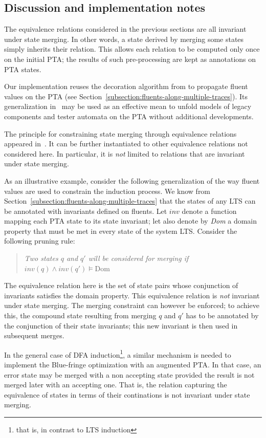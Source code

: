 \subsection{Discussion and implementation notes\label{subsection:qsm-constraints-implementation-notes}}

The equivalence relations considered in the previous sections are all invariant under state merging. In other words, a state derived by merging some states simply inherits their relation. This allows each relation to be computed only once on the initial PTA; the results of such pre-processing are kept as annotations on PTA states. 

Our implementation reuses the decoration algorithm from \cite{Damas:2006} to propagate fluent values on the PTA (see Section~\ref{subsection:fluents-along-multiple-traces}). Its generalization in~\cite{Damas:2011} may be used as an effective mean to unfold models of legacy components and tester automata on the PTA without additional developments.

The principle for constraining state merging through equivalence relations appeared in~\cite{Coste:1998, Coste:2004}. It can be further instantiated to other equivalence relations not considered here. In particular, it is \emph{not} limited to relations that are invariant under state merging.

As an illustrative example, consider the following generalization of the way fluent values are used to constrain the induction process. We know from Section~\ref{subsection:fluents-along-multiple-traces} that the states of any LTS can be annotated with invariants defined on fluents. Let $inv$ denote a function mapping each PTA state to its state invariant; let also denote by \emph{Dom} a domain property that must be met in every state of the system LTS. Consider the following pruning rule:
\begin{quote}
\emph{Two states $q$ and $q'$ will be considered for merging if $inv(q) \wedge inv(q') \models \mbox{Dom}$}
\end{quote}

The equivalence relation here is the set of state pairs whose conjunction of invariants satisfies the domain property. This equivalence relation is \emph{not} invariant under state merging. The merging constraint can however be enforced; to achieve this, the compound state resulting from merging $q$ and $q'$ has to be annotated by the conjunction of their state invariants; this new invariant is then used in subsequent merges.

In the general case of DFA induction\footnote{that is, in contrast to LTS induction}, a similar mechanism is needed to implement the Blue-fringe optimization with an augmented PTA. In that case, an error state may be merged with a non accepting state provided the result is not merged later with an accepting one. That is, the relation capturing the equivalence of states in terms of their continations is not invariant under state merging.
